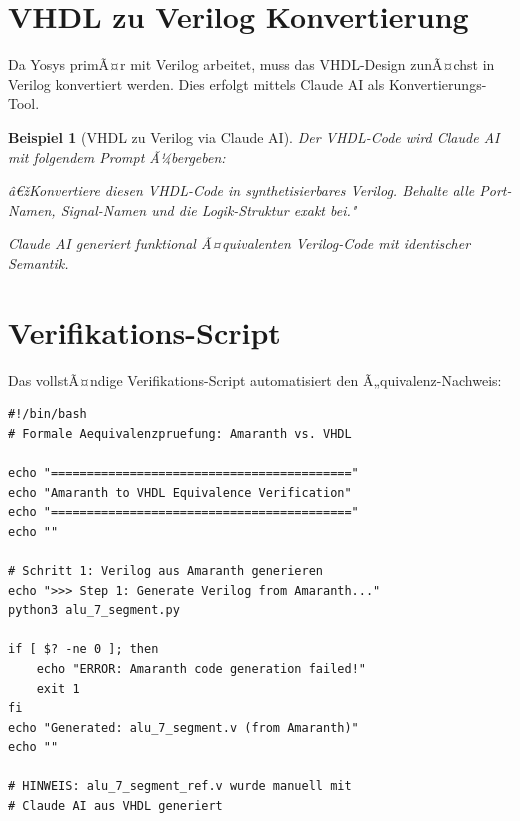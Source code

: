 ﻿\documentclass[12pt,a4paper]{report}
\newtheorem{beispiel}{Beispiel}[section]
\begin{document}
\section{VHDL zu Verilog Konvertierung}

Da Yosys primÃ¤r mit Verilog arbeitet, muss das VHDL-Design zunÃ¤chst in Verilog konvertiert werden. Dies erfolgt mittels Claude AI als Konvertierungs-Tool.

\begin{beispiel}[VHDL zu Verilog via Claude AI]
Der VHDL-Code wird Claude AI mit folgendem Prompt Ã¼bergeben:

\textit{â€žKonvertiere diesen VHDL-Code in synthetisierbares Verilog. Behalte alle Port-Namen, Signal-Namen und die Logik-Struktur exakt bei."}

Claude AI generiert funktional Ã¤quivalenten Verilog-Code mit identischer Semantik.
\end{beispiel}

\section{Verifikations-Script}

Das vollstÃ¤ndige Verifikations-Script automatisiert den Ã„quivalenz-Nachweis:

\begin{lstlisting}[style=bashstyle, caption={Verifikations-Script - Teil 1}]
#!/bin/bash
# Formale Aequivalenzpruefung: Amaranth vs. VHDL

echo "=========================================="
echo "Amaranth to VHDL Equivalence Verification"
echo "=========================================="
echo ""

# Schritt 1: Verilog aus Amaranth generieren
echo ">>> Step 1: Generate Verilog from Amaranth..."
python3 alu_7_segment.py

if [ $? -ne 0 ]; then
    echo "ERROR: Amaranth code generation failed!"
    exit 1
fi
echo "Generated: alu_7_segment.v (from Amaranth)"
echo ""

# HINWEIS: alu_7_segment_ref.v wurde manuell mit
# Claude AI aus VHDL generiert
\end{lstlisting}
\end{document}
